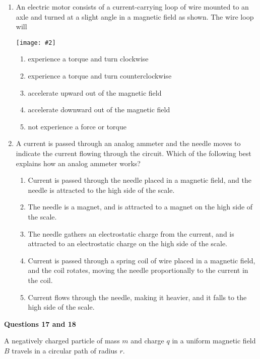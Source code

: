 \documentclass[11pt]{article}
\newcommand{\pic}[2]{\texttt{[image: \#2]}}
\begin{document}
\begin{multicols}{2}
\begin{enumerate}[leftmargin=18pt]
    \columnbreak

  \item An electric motor consists of a current-carrying loop of wire mounted
    to an axle and turned at a slight angle in a magnetic field as shown. The
    wire loop will
    
    \pic{.4}{screen5.png}
    \begin{enumerate}[noitemsep,topsep=0pt,leftmargin=18pt,label=(\Alph*)]
    \item experience a torque and turn clockwise
    \item experience a torque and turn counterclockwise
    \item accelerate upward out of the magnetic field
    \item accelerate downward out of the magnetic field
    \item not experience a force or torque
    \end{enumerate}

  \item A current is passed through an analog ammeter and the needle moves
    to indicate the current flowing through the circuit. Which of the
    following best explains how an analog ammeter works?
    \begin{enumerate}[noitemsep,topsep=0pt,leftmargin=18pt,label=(\Alph*)]
    \item Current is passed through the needle placed in a magnetic field, and
      the needle is attracted to the high side of the scale.
    \item The needle is a magnet, and is attracted to a magnet on the high side
      of the scale.
    \item The needle gathers an electrostatic charge from the current, and is
      attracted to an electrostatic charge on the high side of the scale.
    \item Current is passed through a spring coil of wire placed in a magnetic
      field, and the coil rotates, moving the needle proportionally to the
      current in the coil.
    \item Current flows through the needle, making it heavier, and it falls to
      the high side of the scale.
    \end{enumerate}
  \end{enumerate}

  \columnbreak
  
  \textbf{Questions 17 and 18}
  
  A negatively charged particle of mass $m$ and charge $q$ in a uniform
  magnetic field $B$ travels in a circular path of radius $r$.
  \begin{center}
  \end{center}


\end{multicols}
\end{document}
